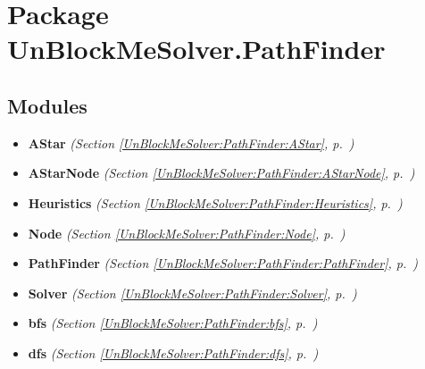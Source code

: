 %
%
%


\section{Package UnBlockMeSolver.PathFinder}

    \label{UnBlockMeSolver:PathFinder}


\subsection{Modules}

\begin{itemize}
\setlength{\parskip}{0ex}
\item \textbf{AStar}
  \textit{(Section \ref{UnBlockMeSolver:PathFinder:AStar}, p.~\pageref{UnBlockMeSolver:PathFinder:AStar})}

\item \textbf{AStarNode}
  \textit{(Section \ref{UnBlockMeSolver:PathFinder:AStarNode}, p.~\pageref{UnBlockMeSolver:PathFinder:AStarNode})}

\item \textbf{Heuristics}
  \textit{(Section \ref{UnBlockMeSolver:PathFinder:Heuristics}, p.~\pageref{UnBlockMeSolver:PathFinder:Heuristics})}

\item \textbf{Node}
  \textit{(Section \ref{UnBlockMeSolver:PathFinder:Node}, p.~\pageref{UnBlockMeSolver:PathFinder:Node})}

\item \textbf{PathFinder}
  \textit{(Section \ref{UnBlockMeSolver:PathFinder:PathFinder}, p.~\pageref{UnBlockMeSolver:PathFinder:PathFinder})}

\item \textbf{Solver}
  \textit{(Section \ref{UnBlockMeSolver:PathFinder:Solver}, p.~\pageref{UnBlockMeSolver:PathFinder:Solver})}

\item \textbf{bfs}
  \textit{(Section \ref{UnBlockMeSolver:PathFinder:bfs}, p.~\pageref{UnBlockMeSolver:PathFinder:bfs})}

\item \textbf{dfs}
  \textit{(Section \ref{UnBlockMeSolver:PathFinder:dfs}, p.~\pageref{UnBlockMeSolver:PathFinder:dfs})}

\end{itemize}


